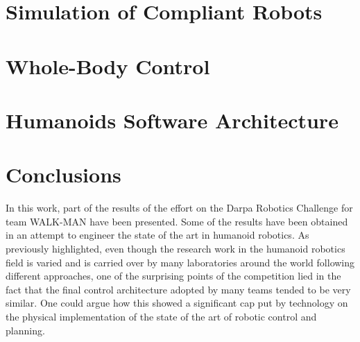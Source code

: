 \documentclass[%
	paper=A4,					%
	twoside=true,				%
	openright,			.
	parskip=full,				%
	chapterprefix=true,			%
	11pt,						%
	headings=normal,			%
	bibliography=totoc,			%
	listof=totoc,				%
	titlepage=on,				%
	captions=tableabove,		%
	draft=false,				%
]{scrreprt}%
\begin{document}
 
\chapter{Simulation of Compliant Robots}
\label{simulator}


\chapter{Whole-Body Control}
\label{opensot}


\chapter{Humanoids Software Architecture}
\label{architecture}


\chapter{Conclusions}

In this work, part of the results of the effort on the Darpa Robotics Challenge for team WALK-MAN have been presented.
Some of the results have been obtained in an attempt to engineer the state of the art in humanoid robotics.
As previously highlighted, even though the research work in the humanoid robotics field is varied and is carried over by many laboratories around the world following different approaches, one of the surprising points of the competition lied in the fact that the final control architecture adopted by many teams tended to be very similar. One could argue how this showed a significant cap put by technology on the physical implementation of the state of the art of robotic control and planning.
\end{document}
